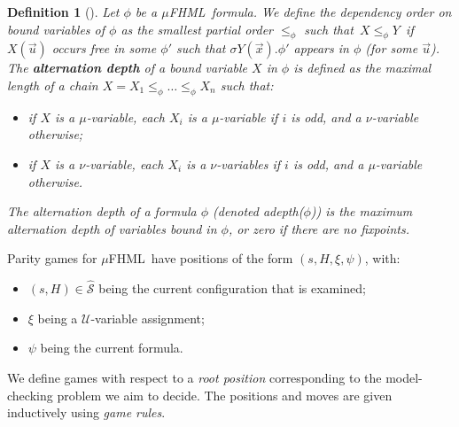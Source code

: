 \documentclass[10pt,a4paper]{article}
\newtheorem{definition}[theorem]{Definition}
\theoremstyle{definition}
\theoremstyle{remark}
\newcommand\boldemph[1]{\emph{\textbf{#1}}}
\newcommand\fhml[0]{$\mu$FHML}
\newcommand\Scal{\mathcal{S}}
\newcommand\Ucal{\mathcal{U}}
\newcommand\fstates[0]{\hat{\Scal}}
\begin{document}
\begin{definition}[\cite{BradfieldW18, EmersonJS01}]\label{def:altDepthNom}
    Let $\phi$ be a \fhml\ formula. 
    We define the \emph{dependency order} on bound variables of $\phi$ as the smallest partial order $\leq_\phi$ such that\
    $X \leq_\phi Y$\
    if $X(\vec u)$ occurs free in some $\phi'$ such that $\sigma Y(\vec x) .\phi'$ appears in $\phi$ (for some $\vec u$). 
    \\
    The \boldemph{alternation depth} of a 
    bound variable $X$ in $\phi$ is defined as the maximal length of a chain $X=X_1 \leq_\phi \dots \leq_\phi X_n$ such that:
    \begin{itemize}
        \item if $X$ is a $\mu$-variable, each $X_i$ is a $\mu$-variable if $i$ is odd, and a $\nu$-variable otherwise; 
    \item if $X$ is a $\nu$-variable,  each $X_i$ is a $\nu$-variables if $i$ is odd, and a $\mu$-variable otherwise. 
    \end{itemize}
    The {alternation depth} of a formula $\phi$ (denoted \emph{adepth($\phi$)}) is the maximum alternation depth of variables bound in $\phi$, or zero if there are no fixpoints.
\end{definition}

Parity games for \fhml\ have positions of the form $(s, H, \xi, \psi)$, with:
\begin{itemize}
    \item $(s, H) \in \fstates$ being the current configuration that is examined;
    \item $\xi$ being a $\Ucal$-variable assignment;
    \item $\psi$ being the current formula. 
\end{itemize}
We define games with respect to a \emph{root position} corresponding to the model-checking problem we aim to decide. The positions and moves are given inductively using \emph{game rules}.
\end{document}
